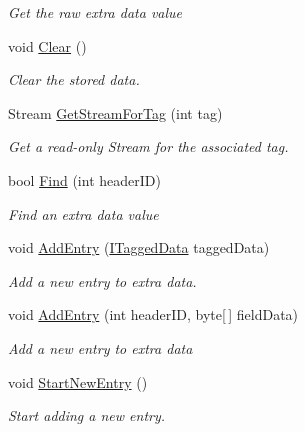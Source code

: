 \begin{DoxyCompactItemize}
\begin{DoxyCompactList}\small\item\em Get the raw extra data value \end{DoxyCompactList}\item 
void \hyperlink{class_i_c_sharp_code_1_1_sharp_zip_lib_1_1_zip_1_1_zip_extra_data_a3ef708be128a41a9dafd3a6b8c372a94}{Clear} ()
\begin{DoxyCompactList}\small\item\em Clear the stored data. \end{DoxyCompactList}\item 
Stream \hyperlink{class_i_c_sharp_code_1_1_sharp_zip_lib_1_1_zip_1_1_zip_extra_data_a511506164310e864f98bea4223737d00}{Get\+Stream\+For\+Tag} (int tag)
\begin{DoxyCompactList}\small\item\em Get a read-\/only Stream for the associated tag. \end{DoxyCompactList}\item 
bool \hyperlink{class_i_c_sharp_code_1_1_sharp_zip_lib_1_1_zip_1_1_zip_extra_data_a91e0c6c1d11967653256ccb161f9818c}{Find} (int header\+ID)
\begin{DoxyCompactList}\small\item\em Find an extra data value \end{DoxyCompactList}\item 
void \hyperlink{class_i_c_sharp_code_1_1_sharp_zip_lib_1_1_zip_1_1_zip_extra_data_a86f3cb0b8dcd274f0bc84d75e06ba703}{Add\+Entry} (\hyperlink{interface_i_c_sharp_code_1_1_sharp_zip_lib_1_1_zip_1_1_i_tagged_data}{I\+Tagged\+Data} tagged\+Data)
\begin{DoxyCompactList}\small\item\em Add a new entry to extra data. \end{DoxyCompactList}\item 
void \hyperlink{class_i_c_sharp_code_1_1_sharp_zip_lib_1_1_zip_1_1_zip_extra_data_a7b8994c059c3b2ecf4cc7a6a60e592ff}{Add\+Entry} (int header\+ID, byte\mbox{[}$\,$\mbox{]} field\+Data)
\begin{DoxyCompactList}\small\item\em Add a new entry to extra data \end{DoxyCompactList}\item 
void \hyperlink{class_i_c_sharp_code_1_1_sharp_zip_lib_1_1_zip_1_1_zip_extra_data_a3fd5ac216b1b6a0fe5ae92ea8156f20a}{Start\+New\+Entry} ()
\begin{DoxyCompactList}\small\item\em Start adding a new entry. \end{DoxyCompactList}\item 

\end{DoxyCompactItemize}
